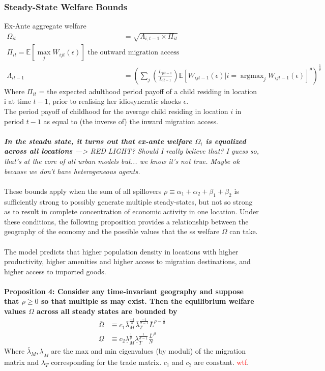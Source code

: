 \documentclass[12pt, final]{article}
\DeclareMathOperator{\argmax}{argmax}
\begin{document}
\subsubsection{Steady-State Welfare Bounds}
Ex-Ante aggregate welfare 
\begin{align*}
    \Omega_{it} &= \sqrt{\Lambda_{i,t-1} \times \Pi_{it}} \\
    \Pi_{it} = \mathbb{E}[\max_j W_{ijt}(\epsilon)] \text{ the outward migration access}\\
    \Lambda_{it-1} &= (\sum_j (\frac{L_{jit-1}}{L_{it-1}}) \mathbb{E}[W_{ijt-1}(\epsilon) | i = \argmax_j W_{ijt-1}(\epsilon)]^\theta)^{\frac{1}{\theta}}
\end{align*}
Where $\Pi_{it}$ = the expected adulthood period payoff of a child residing in location i at time $t-1$, prior to realising her idiosyncratic shocks $\epsilon$.
\\
The period payoff of childhood for the average child residing in location $i$ in period $t-1$ as equal to (the inverse of) the inward migration access.
\\
\\
\textit{\textbf{In the steadu state, it turns out that ex-ante welfare $\Omega_i$ is equalized across all locations} ---> RED LIGHT? Should I really believe that? I guess so, that's at the core of all urban models but... we know it's not true. Maybe ok because we don't have heterogeneous agents.}
\\
\\
These bounds apply when the sum of all spillovers $\rho \equiv \alpha_1 + \alpha_2 + \beta_1 + \beta_2$ is sufficiently strong to possibly generate multiple steady-states, but not so strong as to result in complete concentration of economic activity in one location. Under these conditions, the following proposition provides a relationship between the geography of the economy and the possible values that the ss welfare $\Omega$ can take.
\\
\\
The model predicts that higher population density in locations with higher productivity, higher amenities and higher access to migration destinations, and higher access to imported goods.
\\
\\
\textbf{Proposition 4: Consider any time-invariant geography and suppose that $\rho \geq 0$ so that multiple ss may exist. Then the equilibrium welfare values $\Omega$ across all steady states are bounded by}
\begin{align*}
    \bar{\Omega} &\equiv c_1 \bar{\lambda}_M^{\frac{-1}{\theta}} \bar{\lambda}_T ^{\frac{-1}{\sigma-1}} \bar{L}^{\rho - \frac{1}{\theta}} \\
    \underline{\Omega} &\equiv c_2 \underline{\lambda}_M^{\frac{1}{\theta}} \underline{\lambda}_T ^{\frac{1}{\sigma-1}} \frac{\bar{L}}{N}^{\rho}
\end{align*}
Where $\bar{\lambda}_M,\underline{\lambda}_M$ are the max and min eigenvalues (by moduli) of the migration matrix and $\lambda_T$ corresponding for the trade matrix. $c_1$ and $c_2$ are constant. \textcolor{red}{wtf}.
\\
\\
\end{document}
